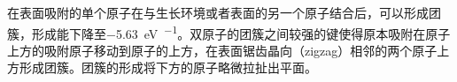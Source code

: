     在表面吸附的单个原子在与生长环境或者表面的另一个原子结合后，可以形成团簇，形成能下降至\SI{-5.63}{\electronvolt\per\atom}。双原子的团簇之间较强的键使得原本吸附在原子上方的吸附原子移动到原子的上方，在表面锯齿晶向（zigzag）相邻的两个原子上方形成团簇。团簇的形成将下方的原子略微拉扯出平面。

    \begin{figure}[htb]
        \\[-0.5ex]
\end{figure}
